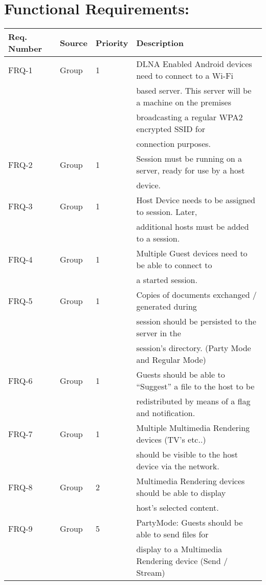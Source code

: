 \documentclass[12pt]{article}
\begin{document}
\section{Functional Requirements:}
\begin{center} \begin{tabular}[h]{|l|l|l|l|}
\hline
Req. Number & Source & Priority & Description \\
\hline
FRQ-1 & Group & 1 & DLNA Enabled Android devices need to connect to a Wi-Fi\\ & & &
					based server.  This server will be a machine on the premises\\ & & &
					broadcasting a regular WPA2 encrypted SSID for\\ & & & 
					 connection purposes.\\
\hline
FRQ-2 & Group & 1 & Session must be running on a server, ready for use by a host\\ & & & 
					device.\\
\hline
FRQ-3 & Group & 1 & Host Device needs to be assigned to session. Later, \\ & & & 
					additional hosts must be added to a session.\\
\hline
FRQ-4 & Group & 1 & Multiple Guest devices need to be able to connect to\\ & & & 
					a started session.\\
\hline
FRQ-5 & Group & 1 & Copies of documents exchanged / generated during \\ & & & 
					session should be persisted to the server in the \\ & & & 
					session's directory. (Party Mode and Regular Mode)\\
\hline
FRQ-6 & Group & 1 & Guests should be able to “Suggest” a file to the host to be\\ & & & 
					 redistributed by means of a flag and notification.\\
\hline
FRQ-7 & Group & 1 & Multiple Multimedia Rendering devices (TV's etc..) \\ & & & 
					should be visible to the host device via the network.\\
\hline
FRQ-8 & Group & 2 & Multimedia Rendering devices should be able to display \\ & & & 
					host's selected content.\\
\hline
FRQ-9 & Group & 5 & PartyMode: Guests should be able to send files for \\ & & & 
					display to a Multimedia Rendering device (Send / Stream)\\

\end{tabular}
\end{center}
\end{document}
